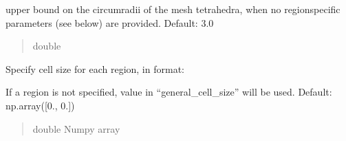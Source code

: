 \documentclass[letterpaper,10pt,english]{sphinxmanual}
\begin{document}
\begin{fulllineitems}
\begin{fulllineitems}
\begin{quote}
\begin{description}
\end{description}\end{quote}

\end{fulllineitems}


\begin{fulllineitems}
\label{\detokenize{_autosummary/nirfasterff.utils.MeshingParams:nirfasterff.utils.MeshingParams.general_cell_size}}
\pysigstartsignatures
\pysigline
{}
\pysigstopsignatures
\sphinxAtStartPar
upper bound on the circumradii of the mesh tetrahedra, when no region\sphinxhyphen{}specific parameters (see below) are provided. Default: 3.0
\begin{quote}\begin{description}
\sphinxAtStartPar
double

\end{description}\end{quote}

\end{fulllineitems}


\begin{fulllineitems}
\label{\detokenize{_autosummary/nirfasterff.utils.MeshingParams:nirfasterff.utils.MeshingParams.subdomain}}
\pysigstartsignatures
\pysigline
{}
\pysigstopsignatures
\sphinxAtStartPar
Specify cell size for each region, in format:

\begin{sphinxVerbatim}[commandchars=\\\{\}]
\PYG{p}{[} \PYG{p}{]}
\PYG{p}{[} \PYG{p}{]}
\end{sphinxVerbatim}

\sphinxAtStartPar
If a region is not specified, value in “general\_cell\_size” will be used.  Default: np.array({[}0., 0.{]})
\begin{quote}\begin{description}
\sphinxAtStartPar
double Numpy array


\end{description}
\end{quote}
\end{fulllineitems}
\end{fulllineitems}
\end{document}
